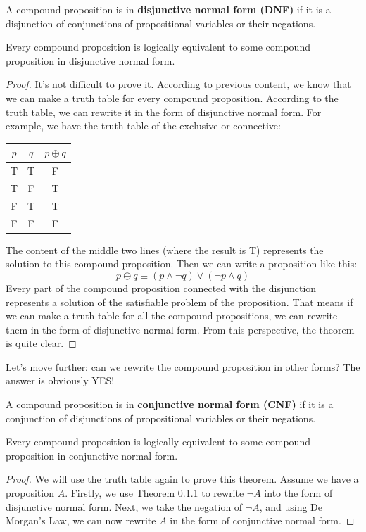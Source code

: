 \documentclass[oneside]{book}
\begin{document}
\begin{definition}
A compound proposition is in \textbf{disjunctive normal form (DNF)} if it is a disjunction of conjunctions of propositional variables or their negations.
\end{definition}

\begin{theorem}
Every compound proposition is logically equivalent to some compound proposition in disjunctive normal form.
\end{theorem}
\begin{proof}
It's not difficult to prove it. According to previous content, we know that we can make a truth table for every compound proposition. According to the truth table, we can rewrite it in the form of disjunctive normal form. For example, we have the truth table of the exclusive-or connective:
\begin{center}
\begin{tabular}{cc|c}
\toprule
$p$ & $q$ & $p \oplus q$ \\
\midrule
T & T & F \\
T & F & T \\
F & T & T \\
F & F & F \\
\bottomrule
\end{tabular}
\end{center}
The content of the middle two lines (where the result is T) represents the solution to this compound proposition. Then we can write a proposition like this:
$$ p \oplus q \equiv (p \wedge \neg q) \vee (\neg p \wedge q) $$
Every part of the compound proposition connected with the disjunction represents a solution of the satisfiable problem of the proposition. That means if we can make a truth table for all the compound propositions, we can rewrite them in the form of disjunctive normal form. From this perspective, the theorem is quite clear.
\end{proof}

Let's move further: can we rewrite the compound proposition in other forms? The answer is obviously YES!

\begin{definition}
A compound proposition is in \textbf{conjunctive normal form (CNF)} if it is a conjunction of disjunctions of propositional variables or their negations.
\end{definition}

\begin{theorem}
Every compound proposition is logically equivalent to some compound proposition in conjunctive normal form.
\end{theorem}
\begin{proof}
We will use the truth table again to prove this theorem. Assume we have a proposition $A$. Firstly, we use Theorem 0.1.1 to rewrite $\neg A$ into the form of disjunctive normal form. Next, we take the negation of $\neg A$, and using De Morgan’s Law, we can now rewrite $A$ in the form of conjunctive normal form.
\end{proof}
\end{document}
